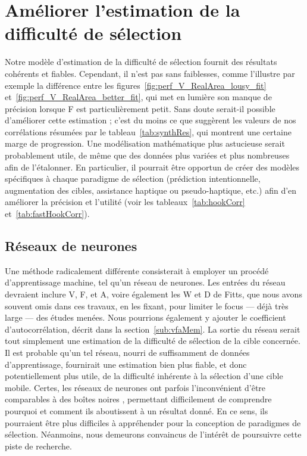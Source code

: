 	\section{Améliorer l'estimation de la difficulté de sélection}
	Notre modèle d'estimation de la difficulté de sélection fournit des résultats cohérents et fiables. Cependant, il n'est pas sans faiblesses, comme l'illustre par exemple la différence entre les figures~\ref{fig:perf_V_RealArea_lousy_fit} et~\ref{fig:perf_V_RealArea_better_fit}, qui met en lumière son manque de précision lorsque F est particulièrement petit. Sans doute serait-il possible d'améliorer cette estimation ; c'est du moins ce que suggèrent les valeurs de nos corrélations résumées par le tableau~\ref{tab:synthRes}, qui montrent une certaine marge de progression. Une modélisation mathématique plus astucieuse serait probablement utile, de même que des données plus variées et plus nombreuses afin de l'étalonner. En particulier, il pourrait être opportun de créer des modèles spécifiques à chaque paradigme de sélection (prédiction intentionnelle, augmentation des cibles, assistance haptique ou pseudo-haptique, etc.) afin d'en améliorer la précision et l'utilité (voir les tableaux~\ref{tab:hookCorr} et~\ref{tab:fastHookCorr}).
	
	\subsection{Réseaux de neurones}
	Une méthode radicalement différente consisterait à employer un procédé d'apprentissage machine, tel qu'un réseau de neurones. Les entrées du réseau devraient inclure V, F, et A, voire également les W et D de Fitts, que nous avons souvent omis dans ces travaux, en les fixant, pour limiter le focus --- déjà très large --- des études menées. Nous pourrions également y ajouter le coefficient d'autocorrélation, décrit dans la section~\ref{sub:vfaMem}. La sortie du réseau serait tout simplement une estimation de la difficulté de sélection de la cible concernée. Il est probable qu'un tel réseau, nourri de suffisamment de données d'apprentissage, fournirait une estimation bien plus fiable, et donc potentiellement plus utile, de la difficulté inhérente à la sélection d'une cible mobile. Certes, les réseaux de neurones ont parfois l'inconvénient d'être comparables à des \og boîtes noires \fg{}, permettant difficilement de comprendre pourquoi et comment ils aboutissent à un résultat donné. En ce sens, ils pourraient être plus difficiles à appréhender pour la conception de paradigmes de sélection. Néanmoins, nous demeurons convaincus de l'intérêt de poursuivre cette piste de recherche.
	
